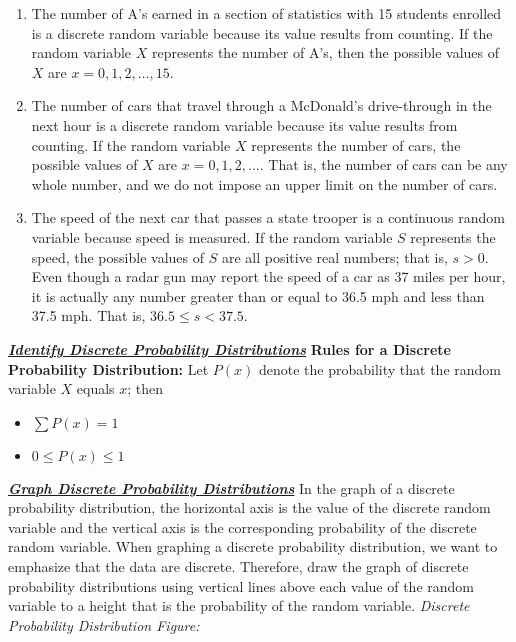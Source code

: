 \documentclass{report}
\begin{document}
    \begin{enumerate}[label=(\alph*)]
        \item The number of A's earned in a section of statistics with 15 students enrolled is a discrete random variable because its value results from counting. If the random variable $X$ represents the number of A's, then the possible values of $X$ are $x = 0, 1, 2, \ldots, 15$.
        \item The number of cars that travel through a McDonald's drive-through in the next hour is a discrete random variable because its value results from counting. If the random variable $X$ represents the number of cars, the possible values of $X$ are $x = 0, 1, 2, \ldots$. That is, the number of cars can be any whole number, and we do not impose an upper limit on the number of cars.
        \item The speed of the next car that passes a state trooper is a continuous random variable because speed is measured. If the random variable $S$ represents the speed, the possible values of $S$ are all positive real numbers; that is, $s > 0$. Even though a radar gun may report the speed of a car as 37 miles per hour, it is actually any number greater than or equal to 36.5 mph and less than 37.5 mph. That is, $36.5 \leq s < 37.5$.
    \end{enumerate}

    \bigbreak \noindent \bigbreak \noindent 
    \textbf{\textit{\underline{Identify Discrete Probability Distributions}}}
    \bigbreak \noindent 
    \textbf{Rules for a Discrete Probability Distribution:}
    \bigbreak \noindent 
    Let $P(x)$ denote the probability that the random variable $X$ equals $x$; then
    \begin{itemize}
        \item $ \sum P(x) = 1 $
        \item $0 \leq P(x) \leq 1$
    \end{itemize}

    \bigbreak \noindent \bigbreak \noindent 
    \textbf{\textit{\underline{Graph Discrete Probability Distributions}}}
    \bigbreak \noindent 
    In the graph of a discrete probability distribution, the horizontal axis is the value of the discrete random variable and the vertical axis is the corresponding probability of the discrete random variable. When graphing a discrete probability distribution, we want to emphasize that the data are discrete. Therefore, draw the graph of discrete probability distributions using vertical lines above each value of the random variable to a height that is the probability of the random variable.
    \bigbreak \noindent 
    \textit{Discrete Probability Distribution Figure:}
\end{document}

